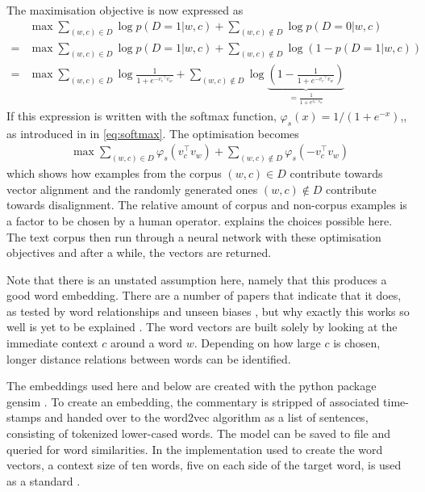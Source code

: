 \documentclass[10pt, a4paper]{UUThesisTemplate}
\begin{document}
The maximisation objective is now expressed as
\begin{align}
&\max \sum_{(w,c) \in D} \log p(D=1|w,c) + \sum_{(w, c) \notin D} \log p(D=0|w,c)\\
=& \max\sum_{(w,c) \in D} \log p(D=1|w,c) + \sum_{(w, c) \notin D} \log \left(1 - p(D=1|w,c)\right)\\
=& \max \sum_{(w,c) \in D} \log \frac1{1+e^{-{v_c}^\intercal v_w}} + \sum_{(w,c) \notin D} \log \underbrace{\left(1-\frac1{1+e^{-{v_c}^\intercal v_w}}\right)}_{=\frac1{1+e^{{v_c}^\intercal v_w}}}
\end{align}
If this expression is written with the softmax function, $\varphi_s(x) = 1/(1+e^{-x})$,, as introduced in in \eqref{eq:softmax}. The optimisation becomes
\begin{align}
\max \sum_{(w,c) \in D} \varphi_s(v_c^\intercal v_w) + \sum_{(w,c) \notin D} \varphi_s(-v_c^\intercal v_w)
\end{align}
which shows how examples from the corpus $(w,c)\in D$ contribute towards vector alignment and the randomly generated ones $(w,c) \notin D$ contribute towards disalignment. The relative amount of corpus and non-corpus examples is a factor to be chosen by a human operator. \cite{skipgram} explains the choices possible here. The text corpus then run through a neural network with these optimisation objectives and after a while, the vectors are returned.

Note that there is an unstated assumption here, namely that this produces a good word embedding. There are a number of papers that indicate that it does, as tested by word relationships and unseen biases \cite{skipgram, wordbias}, but why exactly this works so well is yet to be explained \cite{word2vecexplained}. The word vectors are built solely by looking at the immediate context $c$ around a word $w$. Depending on how large $c$ is chosen, longer distance relations between words can be identified.

The embeddings used here and below are created with the python package gensim \cite{gensim}. To create an embedding, the commentary is stripped of associated time-stamps and handed over to the word2vec algorithm as a list of sentences, consisting of tokenized lower-cased words. The model can be saved to file and queried for word similarities. In the implementation used to create the word vectors, a context size of ten words, five on each side of the target word, is used as a standard \cite{contextlength}.
\end{document}
